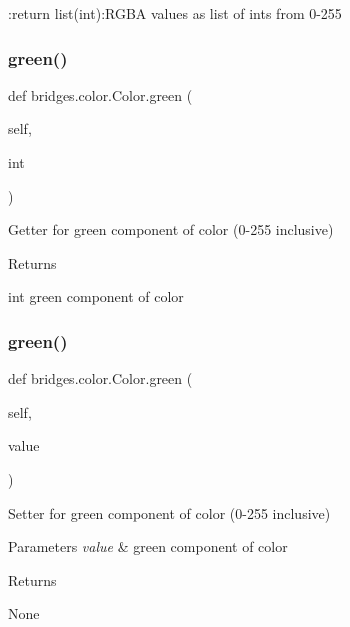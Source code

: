 \+:return list(int)\+:R\+G\+BA values as list of ints from 0-\/255 

\mbox{\label{classbridges_1_1color_1_1_color_a86ec858a55491936054abcea865498ec}} 
\subsubsection{\texorpdfstring{green()}{green()}\hspace{0.1cm}{\footnotesize\ttfamily [1/2]}}
{\footnotesize\ttfamily def bridges.\+color.\+Color.\+green (\begin{DoxyParamCaption}\item[{}]{self,  }\item[{}]{int }\end{DoxyParamCaption})}



Getter for green component of color (0-\/255 inclusive) 

\begin{DoxyReturn}{Returns}


int green component of color 
\end{DoxyReturn}
\mbox{\label{classbridges_1_1color_1_1_color_a4c0826514c64b53910270336d357ad80}} 
\subsubsection{\texorpdfstring{green()}{green()}\hspace{0.1cm}{\footnotesize\ttfamily [2/2]}}
{\footnotesize\ttfamily def bridges.\+color.\+Color.\+green (\begin{DoxyParamCaption}\item[{}]{self,  }\item[{}]{value }\end{DoxyParamCaption})}



Setter for green component of color (0-\/255 inclusive) 


\begin{DoxyParams}{Parameters}
{\em value} & green component of color \\
\hline
\end{DoxyParams}
\begin{DoxyReturn}{Returns}


None 
\end{DoxyReturn}
\mbox{\label{classbridges_1_1color_1_1_color_ab2b29fe67b6ad8dddde7ff8eddedcce0}} 
